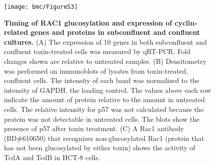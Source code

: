 \begin{figure}[h!]
  \centering
  \texttt{[image: bmc/FigureS3]}
  \caption[Timing of RAC1 glucosylation and expression of cyclin-related genes and proteins in
             subconfluent and confluent cultures.]{
  \textbf{Timing of RAC1 glucosylation and expression of cyclin-related genes and proteins in
             subconfluent and confluent cultures.}
(A) The expression of 10 genes in both subconfluent and confluent toxin-treated cells was measured 
by qRT-PCR. Fold changes shown are relative to untreated samples.
(B) Densitometry was performed on immunoblots of lysates from toxin-treated, confluent cells. The 
intensity of each band was normalized to the intensity of GAPDH, the loading control. The values 
above each row indicate the amount of protein relative to the amount in untreated cells. The relative 
intensity for p57 was not calculated because the protein was not detectable in untreated cells. The 
blots show the presence of p57 after toxin treatment.
(C) A Rac1 antibody (BD\#610650) that recognizes non-glucosylated Rac1 (protein that has not been 
glucosylated by either toxin) shows the activity of TcdA and TcdB in HCT-8 cells. }
  \label{bmc:figs3}
\end{figure}

\finishsupplement
\singlespacing
\printbibliography






